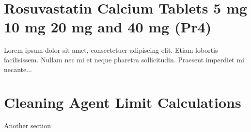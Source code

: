 \documentclass[a4paper,12pt]{report}
\begin{document}
\section*{Rosuvastatin Calcium Tablets 5 mg 10 mg 20 mg and 40 mg (Pr4)}
Lorem ipsum dolor sit amet, consectetuer adipiscing elit.  
Etiam lobortis facilisissem.  Nullam nec mi et neque pharetra 
sollicitudin.  Praesent imperdiet mi necante...
\section{Cleaning Agent Limit Calculations}
Another section
\end{document}
